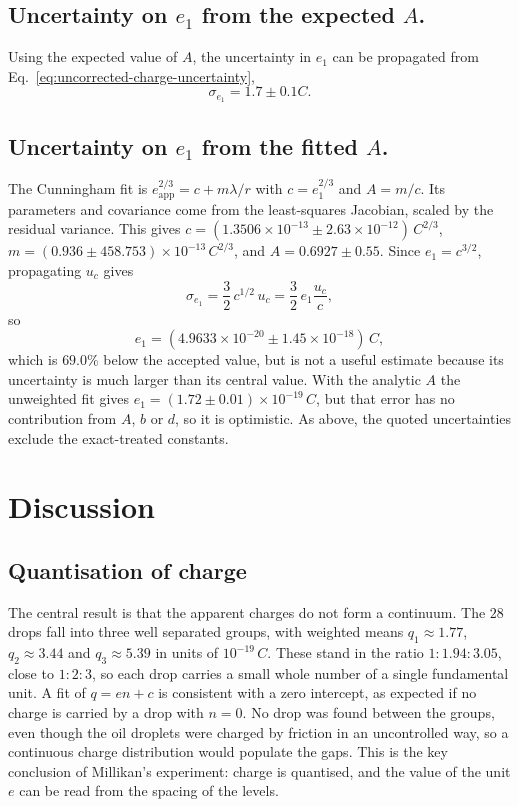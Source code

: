 \documentclass[12pt,a4paper]{article}
\begin{document}
\subsection{Uncertainty on $e_1$ from the expected $A$.}
Using the expected value of $A$, the uncertainty in $e_1$ can be propagated from Eq.~\ref{eq:uncorrected-charge-uncertainty},
\[
    \sigma_{e_1} = 1.7 \pm 0.1 \si{C}.
\]


\subsection{Uncertainty on $e_1$ from the fitted $A$.}
The Cunningham fit is $e_{\mathrm{app}}^{2/3}=c+m\lambda/r$ with
$c=e_1^{2/3}$ and $A=m/c$. Its parameters and covariance come from the
least-squares Jacobian, scaled by the residual variance. This gives
$c=(1.3506\times10^{-13}\pm2.63\times10^{-12})\,\si{C^{2/3}}$,
$m=(0.936\pm458.753)\times10^{-13}\,\si{C^{2/3}}$, and
$A=0.6927\pm0.55$. Since $e_1=c^{3/2}$, propagating $u_c$ gives
\begin{equation}
    \sigma_{e_1}=\frac{3}{2}\,c^{1/2}\,u_c=\frac{3}{2}\,e_1\frac{u_c}{c},
\end{equation}
so
\begin{equation}
    e_1=(4.9633\times10^{-20}\pm1.45\times10^{-18})\,\si{C},
\end{equation}
which is $69.0\%$ below the accepted value, but is not a useful estimate
because its uncertainty is much larger than its central value. With the
analytic $A$ the unweighted fit gives
$e_1=(1.72\pm0.01)\times10^{-19}\,\si{C}$, but that error has no
contribution from $A$, $b$ or $d$, so it is optimistic. As above, the quoted
uncertainties exclude the exact-treated constants.
\newpage

\section{Discussion}

\subsection{Quantisation of charge}
The central result is that the apparent charges do not form a continuum. The
$28$ drops fall into three well separated groups, with weighted means
$q_1\approx1.77$, $q_2\approx3.44$ and $q_3\approx5.39$ in units of
$10^{-19}\,\si{C}$. These stand in the ratio $1:1.94:3.05$, close to
$1:2:3$, so each drop carries a small whole number of a single fundamental
unit. A fit of $q=en+c$ is consistent with a zero intercept, as expected if
no charge is carried by a drop with $n=0$. No drop was found between the
groups, even though the oil droplets were charged by friction in an
uncontrolled way, so a continuous charge distribution would populate the
gaps. This is the key conclusion of Millikan's experiment: charge is
quantised, and the value of the unit $e$ can be read from the spacing
of the levels.
\end{document}
